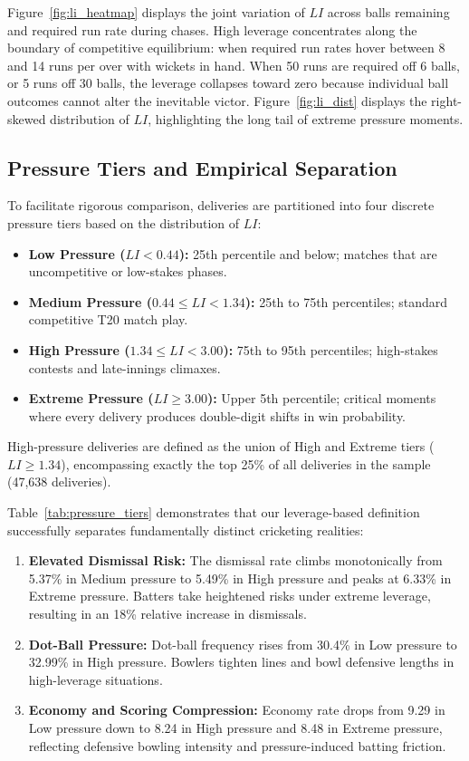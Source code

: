 \documentclass[11pt,a4paper]{article}
\begin{document}
Figure~\ref{fig:li_heatmap} displays the joint variation of $LI$ across balls remaining and required run rate during chases. High leverage concentrates along the boundary of competitive equilibrium: when required run rates hover between 8 and 14 runs per over with wickets in hand. When 50 runs are required off 6 balls, or 5 runs off 30 balls, the leverage collapses toward zero because individual ball outcomes cannot alter the inevitable victor. Figure~\ref{fig:li_dist} displays the right-skewed distribution of $LI$, highlighting the long tail of extreme pressure moments.

\subsection{Pressure Tiers and Empirical Separation}
To facilitate rigorous comparison, deliveries are partitioned into four discrete pressure tiers based on the distribution of $LI$:
\begin{itemize}
    \item \textbf{Low Pressure ($LI < 0.44$):} 25th percentile and below; matches that are uncompetitive or low-stakes phases.
    \item \textbf{Medium Pressure ($0.44 \le LI < 1.34$):} 25th to 75th percentiles; standard competitive T20 match play.
    \item \textbf{High Pressure ($1.34 \le LI < 3.00$):} 75th to 95th percentiles; high-stakes contests and late-innings climaxes.
    \item \textbf{Extreme Pressure ($LI \ge 3.00$):} Upper 5th percentile; critical moments where every delivery produces double-digit shifts in win probability.
\end{itemize}
High-pressure deliveries are defined as the union of High and Extreme tiers ($LI \ge 1.34$), encompassing exactly the top 25\% of all deliveries in the sample (47,638 deliveries).



Table~\ref{tab:pressure_tiers} demonstrates that our leverage-based definition successfully separates fundamentally distinct cricketing realities:
\begin{enumerate}
    \item \textbf{Elevated Dismissal Risk:} The dismissal rate climbs monotonically from 5.37\% in Medium pressure to 5.49\% in High pressure and peaks at 6.33\% in Extreme pressure. Batters take heightened risks under extreme leverage, resulting in an 18\% relative increase in dismissals.
    \item \textbf{Dot-Ball Pressure:} Dot-ball frequency rises from 30.4\% in Low pressure to 32.99\% in High pressure. Bowlers tighten lines and bowl defensive lengths in high-leverage situations.
    \item \textbf{Economy and Scoring Compression:} Economy rate drops from 9.29 in Low pressure down to 8.24 in High pressure and 8.48 in Extreme pressure, reflecting defensive bowling intensity and pressure-induced batting friction.
\end{enumerate}
\end{document}
